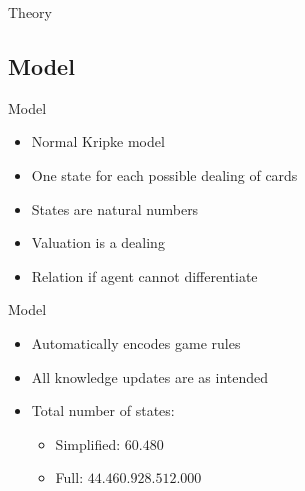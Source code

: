 \begin{frame}{Theory}

\end{frame}

\subsection{Model}
\begin{frame}{Model}
    \begin{itemize}
        \item Normal Kripke model
        \item One state for each possible dealing of cards
        \item States are natural numbers
        \item Valuation is a dealing
        \item Relation if agent cannot differentiate
    \end{itemize}
\end{frame}

\begin{frame}{Model}
    \begin{itemize}
        \item Automatically encodes game rules
        \item All knowledge updates are as intended
        \item Total number of states:
            \begin{itemize}
                \item Simplified: $60.480$
                    \pause
                \item Full: $44.460.928.512.000$
            \end{itemize}
    \end{itemize}
\end{frame}

